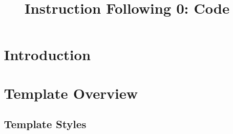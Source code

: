\title{Instruction Following 0: Code}

\maketitle

\section{Introduction}

\section{Template Overview}

\subsection{Template Styles}